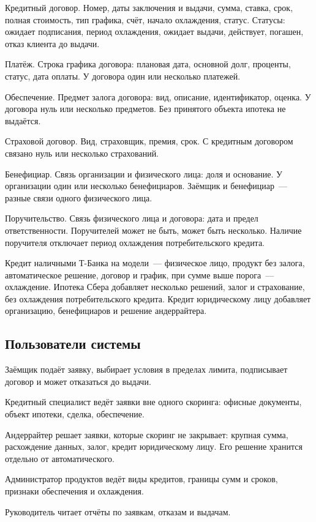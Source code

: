 \documentclass[14pt,a4paper]{extarticle}
\begin{document}
Кредитный договор. Номер, даты заключения и выдачи, сумма, ставка, срок, полная стоимость, тип графика, счёт, начало охлаждения, статус. Статусы: ожидает подписания, период охлаждения, ожидает выдачи, действует, погашен, отказ клиента до выдачи.

Платёж. Строка графика договора: плановая дата, основной долг, проценты, статус, дата оплаты. У договора один или несколько платежей.

Обеспечение. Предмет залога договора: вид, описание, идентификатор, оценка. У договора нуль или несколько предметов. Без принятого объекта ипотека не выдаётся.

Страховой договор. Вид, страховщик, премия, срок. С кредитным договором связано нуль или несколько страхований.

Бенефициар. Связь организации и физического лица: доля и основание. У организации один или несколько бенефициаров. Заёмщик и бенефициар~--- разные связи одного физического лица.

Поручительство. Связь физического лица и договора: дата и предел ответственности. Поручителей может не быть, может быть несколько. Наличие поручителя отключает период охлаждения потребительского кредита.

Кредит наличными Т-Банка на модели~--- физическое лицо, продукт без залога, автоматическое решение, договор и график, при сумме выше порога~--- охлаждение. Ипотека Сбера добавляет несколько решений, залог и страхование, без охлаждения потребительского кредита. Кредит юридическому лицу добавляет организацию, бенефициаров и решение андеррайтера.

\subsection{Пользователи системы}

Заёмщик подаёт заявку, выбирает условия в пределах лимита, подписывает договор и может отказаться до выдачи.

Кредитный специалист ведёт заявки вне одного скоринга: офисные документы, объект ипотеки, сделка, обеспечение.

Андеррайтер решает заявки, которые скоринг не закрывает: крупная сумма, расхождение данных, залог, кредит юридическому лицу. Его решение хранится отдельно от автоматического.

Администратор продуктов ведёт виды кредитов, границы сумм и сроков, признаки обеспечения и охлаждения.

Руководитель читает отчёты по заявкам, отказам и выдачам.
\end{document}
